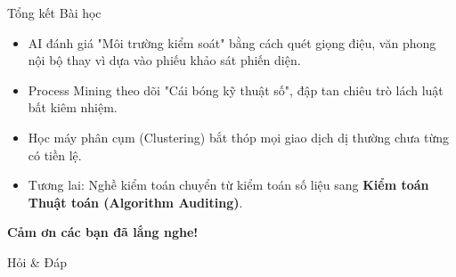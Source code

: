 \documentclass[aspectratio=169]{beamer}
\begin{document}
\begin{frame}{Tổng kết Bài học}
    \begin{itemize}
        \item AI đánh giá "Môi trường kiểm soát" bằng cách quét giọng điệu, văn phong nội bộ thay vì dựa vào phiếu khảo sát phiến diện.
        \item Process Mining theo dõi "Cái bóng kỹ thuật số", đập tan chiêu trò lách luật bất kiêm nhiệm.
        \item Học máy phân cụm (Clustering) bắt thóp mọi giao dịch dị thường chưa từng có tiền lệ.
        \item Tương lai: Nghề kiểm toán chuyển từ kiểm toán số liệu sang \textbf{Kiểm toán Thuật toán (Algorithm Auditing)}.
    \end{itemize}
\end{frame}

\begin{frame}
    \centering
    \Huge \textbf{Cảm ơn các bạn đã lắng nghe!}
    
    \vspace{0.5cm}
    \Large Hỏi \& Đáp
\end{frame}
\end{document}
